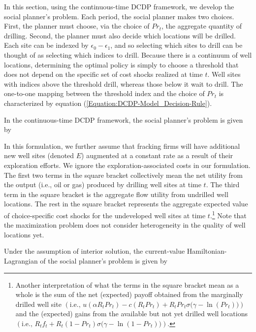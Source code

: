 In this section, using the continuous-time DCDP framework, we develop the social planner's problem. Each period, the social planner makes two choices. First, the planner must choose, via the choice of $Pr_{t}$, the aggregate quantity of drilling. Second, the planner must also decide which locations will be drilled. Each site can be indexed by $\epsilon_{0} - \epsilon_{1}$, and so selecting which sites to drill can be thought of as selecting which indices to drill. Because there is a continuum of well locations, determining the optimal policy is simply to choose a threshold that does not depend on the specific set of cost shocks realized at time $t$. Well sites with indices above the threshold drill, whereas those below it wait to drill. The one-to-one mapping between the threshold index and the choice of $Pr_{t}$ is characterized by equation (\ref{Equation:DCDP-Model_Decision-Rule}).

In the continuous-time DCDP framework, the social planner's problem is given by

In this formulation, we further assume that fracking firms will have additional new well sites (denoted $E$) augmented at a constant rate as a result of their exploration efforts. We ignore the exploration-associated costs in our formulation. The first two terms in the square bracket collectively mean the net utility from the output (i.e., oil or gas) produced by drilling well sites at time $t$. The third term in the square bracket is the aggregate flow utility from undrilled well locations. The rest in the square bracket represents the aggregate expected value of choice-specific cost shocks for the undeveloped well sites at time $t$.\footnote{Another interpretation of what the terms in the square bracket mean as a whole is the sum of the net (expected) payoff obtained from the marginally drilled well site $\left( \text{i.e., } u(\alpha R_{t} Pr_{t}) - c(R_{t} Pr_{t}) + R_{t} Pr_{t} \sigma \big( \gamma - \ln(Pr_{t}) \big) \right)$ and the (expected) gains from the available but not yet drilled well locations $\left( \text{i.e., } R_{t} f_{t} + R_{t} (1 - Pr_{t}) \sigma \big( \gamma - \ln(1 - Pr_{t}) \big) \right)$.} Note that the maximization problem does not consider heterogeneity in the quality of well locations yet. 

Under the assumption of interior solution, the current-value Hamiltonian-Lagrangian of the social planner's problem is given by


